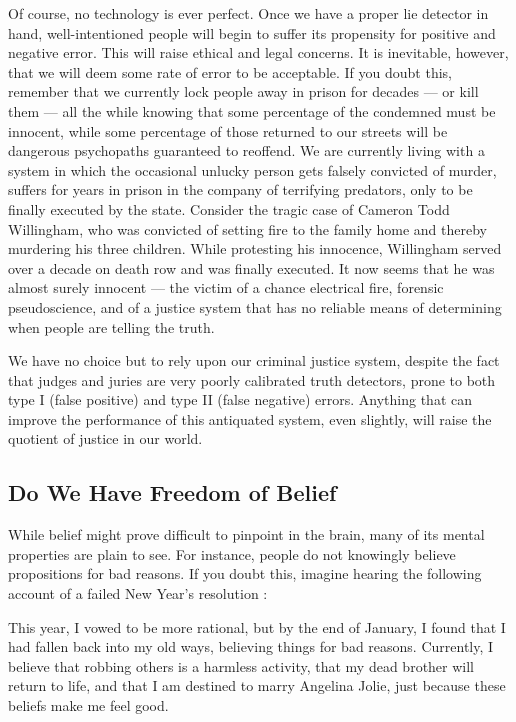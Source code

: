 \documentclass[a4paper,14pt]{extarticle}
\begin{document}
Of course, no technology is ever perfect.
Once we have a proper lie detector in hand, well-intentioned people will begin to suffer its propensity for positive and negative error.
This will raise ethical and legal concerns.
It is inevitable, however, that we will deem some rate of error to be acceptable.
If you doubt this, remember that we currently lock people away in prison for decades --- or kill them --- all the while knowing that some percentage of the condemned must be innocent, while some percentage of those returned to our streets will be dangerous psychopaths guaranteed to reoffend.
We are currently living with a system in which the occasional unlucky person gets falsely convicted of murder, suffers for years in prison in the company of terrifying predators, only to be finally executed by the state.
Consider the tragic case of Cameron Todd Willingham, who was convicted of setting fire to the family home and thereby murdering his three children.
While protesting his innocence, Willingham served over a decade on death row and was finally executed.
It now seems that he was almost surely innocent --- the victim of a chance electrical fire, forensic pseudoscience, and of a justice system that has no reliable means of determining when people are telling the truth.

We have no choice but to rely upon our criminal justice system, despite the fact that judges and juries are very poorly calibrated truth detectors, prone to both type I (false positive) and type II (false negative) errors.
Anything that can improve the performance of this antiquated system, even slightly, will raise the quotient of justice in our world.

\subsection{Do We Have Freedom of Belief}

While belief might prove difficult to pinpoint in the brain, many of its mental properties are plain to see.
For instance, people do not knowingly believe propositions for bad reasons.
If you doubt this, imagine hearing the following account of a failed New Year’s resolution :

This year, I vowed to be more rational, but by the end of January, I found that I had fallen back into my old ways, believing things for bad reasons.
Currently, I believe that robbing others is a harmless activity, that my dead brother will return to life, and that I am destined to marry Angelina Jolie, just because these beliefs make me feel good.
\end{document}
